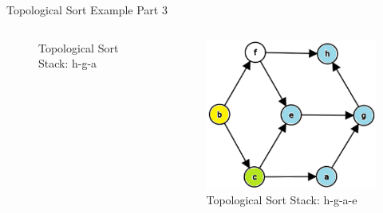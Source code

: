 \documentclass[aspectratio=169]{beamer}%
\begin{document}
\begin{frame}{Topological Sort Example Part 3}
\begin{columns}
\begin{column}{.32\textwidth}
\begin{figure}
                \caption{Topological Sort Stack: h-g-a}
            \end{figure}
        \end{column}
        \hfill
        \begin{column}{.32\textwidth}
            \begin{figure}
                \centering
                \includegraphics[width = .9\linewidth]{topsort9.png}
                \caption{Topological Sort Stack: h-g-a-e}
            \end{figure}
        \end{column}
    \end{columns}
\end{frame}
\end{document}
